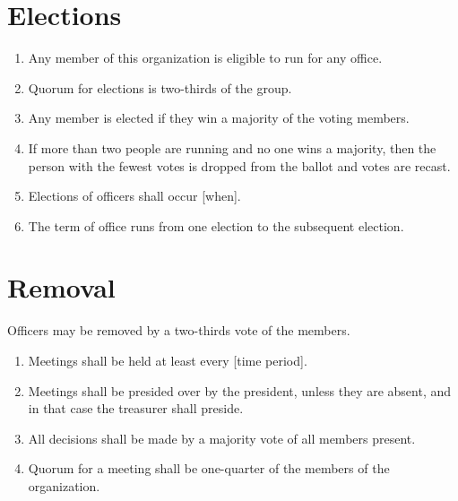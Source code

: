 \documentclass{constitution}
\begin{document}
\section{Elections}
\begin{enumerate}
    \item Any member of this organization is eligible to run for any office.
    \item Quorum for elections is two-thirds of the group.
    \item Any member is elected if they win a majority of the voting members.
    \item If more than two people are running and no one wins a majority, then the person with the fewest votes is dropped from the ballot and votes are recast.
    
    \item Elections of officers shall occur [when].

    \item The term of office runs from one election to the subsequent election.
\end{enumerate}

\section{Removal}
Officers may be removed by a two-thirds vote of the members.

\begin{enumerate}
    \item Meetings shall be held at least every [time period].

    \item Meetings shall be presided over by the president, unless they are absent, and in that case the treasurer shall preside.

    \item All decisions shall be made by a majority vote of all members present.
    \item Quorum for a meeting shall be one-quarter of the members of the organization.
\end{enumerate}
\end{document}
